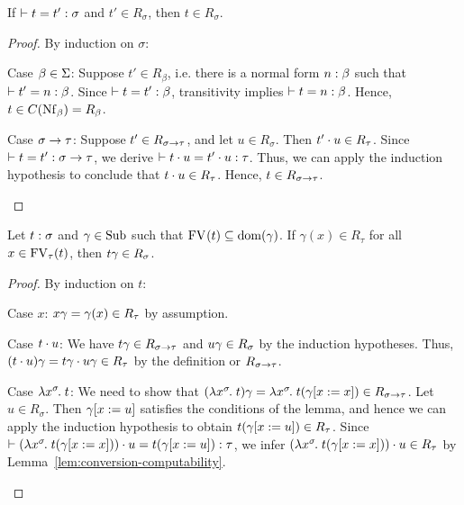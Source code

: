 \begin{lem} \label{lem:conversion-computability}
If $\conv{t}{t'}{\sigma}$ and $t' \in R_\sigma$, then $t \in R_\sigma$.
\begin{proof}
By induction on $\sigma$:
\begin{items}
\item Case $\beta \in \Basetypes$:
Suppose $t' \in R_\beta$, i.e. there is a normal form $\typedtm{n}{\beta}$ such that $\conv{t'}{n}{\beta}$. Since $\conv{t}{t'}{\beta}$, transitivity implies $\conv{t}{n}{\beta}$. Hence, $t \in \convset{\Nf[\beta]} = R_\beta$.

\item Case $\functy{\sigma}{\tau}$:
Suppose $t' \in R_{\functy{\sigma}{\tau}}$, and let $u \in R_\sigma$. Then $\app{t'}{u} \in R_\tau$. Since $\conv{t}{t'}{\functy{\sigma}{\tau}}$, we derive $\conv{\app{t}{u}}{\app{t'}{u}}{\tau}$. Thus, we can apply the induction hypothesis to conclude that $\app{t}{u} \in R_\tau$. Hence, $t \in R_{\functy{\sigma}{\tau}}$. \qedhere
\end{items}
\end{proof}
\end{lem}

\begin{lem} \label{lem:fundamental-lem-norm}
Let $\typedtm{t}{\sigma}$ and $\gamma \in \Sub$ such that $\FV{t} \subs \dom{\gamma}$. If $\gamma(x) \in R_\tau$ for all $x \in \FV[\tau]{t}$, then $\subst{t}{\gamma} \in R_\sigma$.
\begin{proof}
By induction on $t$:
\begin{items}
\item Case $x$:
$\subst{x}{\gamma} = \gamma(x) \in R_\tau$ by assumption.
\item Case $\app{t}{u}$:
We have $\subst{t}{\gamma} \in R_{\functy{\sigma}{\tau}}$ and $\subst{u}{\gamma} \in R_\sigma$ by the induction hypotheses. Thus, $\subst{(\app{t}{u})}{\gamma} = \app{\subst{t}{\gamma}}{\subst{u}{\gamma}} \in R_\tau$ by the definition or $R_{\functy{\sigma}{\tau}}$.
\item Case $\lamv{x}{\sigma}{t}$:
We need to show that $\subst{(\lamv{x}{\sigma}{t})}{\gamma} = \lamv{x}{\sigma}{\subst{t}{(\updsub{\gamma}{x}{x})}} \in R_{\functy{\sigma}{\tau}}$. Let $u \in R_\sigma$. Then $\updsub{\gamma}{x}{u}$ satisfies the conditions of the lemma, and hence we can apply the induction hypothesis to obtain $\subst{t}{(\updsub{\gamma}{x}{u})} \in R_\tau$. Since $\conv{\app{(\lamv{x}{\sigma}{\subst{t}{(\updsub{\gamma}{x}{x})}})}{u}}{\subst{t}{(\updsub{\gamma}{x}{u})}}{\tau}$, we infer $\app{(\lamv{x}{\sigma}{\subst{t}{(\updsub{\gamma}{x}{x})}})}{u} \in R_\tau$ by Lemma~\ref{lem:conversion-computability}. \qedhere
\end{items}
\end{proof}
\end{lem}

